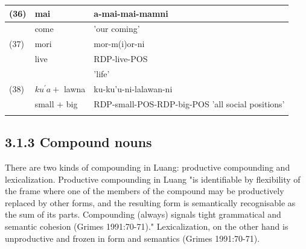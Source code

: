 \documentclass[10pt]{article}
\begin{document}
\begin{center}
\begin{tabular}{|l|l|l|}
\hline
(36) & mai & a-mai-mai-mamni \\
\hline
 & come & 'our coming' \\
\hline
(37) & mori & mor-m(i)or-ni \\
\hline
 & live & RDP-live-POS \\
\hline
 &  & 'life' \\
\hline
(38) & \(k u^{\prime} a+\) lawna & ku-ku'u-ni-lalawan-ni \\
\hline
 & small + big & RDP-small-POS-RDP-big-POS 'all social positions' \\
\hline
 &  &  \\
\hline
\end{tabular}
\end{center}

\subsection*{3.1.3 Compound nouns}
There are two kinds of compounding in Luang: productive compounding and lexicalization. Productive compounding in Luang "is identifiable by flexibility of the frame where one of the members of the compound may be productively replaced by other forms, and the resulting form is semantically recognisable as the sum of its parts. Compounding (always) signals tight grammatical and semantic cohesion (Grimes 1991:70-71)." Lexicalization, on the other hand is unproductive and frozen in form and semantics (Grimes 1991:70-71).
\end{document}
